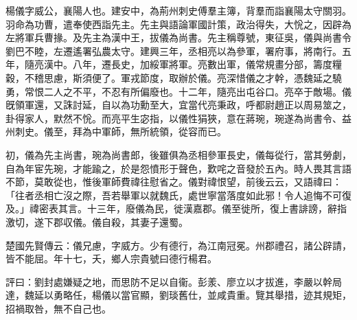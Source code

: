 
\begin{pinyinscope}
楊儀字威公，襄陽人也。建安中，為荊州刺史傅羣主簿，背羣而詣襄陽太守關羽。羽命為功曹，遣奉使西詣先主。先主與語論軍國計策，政治得失，大恱之，因辟為左將軍兵曹掾。及先主為漢中王，拔儀為尚書。先主稱尊號，東征吳，儀與尚書令劉巴不睦，左遷遙署弘農太守。建興三年，丞相亮以為參軍，署府事，將南行。五年，隨亮漢中。八年，遷長史，加綏軍將軍。亮數出軍，儀常規畫分部，籌度糧穀，不稽思慮，斯須便了。軍戎節度，取辦於儀。亮深惜儀之才幹，憑魏延之驍勇，常恨二人之不平，不忍有所偏廢也。十二年，隨亮出屯谷口。亮卒于敵場。儀旣領軍還，又誅討延，自以為功勳至大，宜當代亮秉政，呼都尉趙正以周易筮之，卦得家人，默然不恱。而亮平生宓指，以儀性狷狹，意在蔣琬，琬遂為尚書令、益州刺史。儀至，拜為中軍師，無所統領，從容而已。

初，儀為先主尚書，琬為尚書郎，後雖俱為丞相參軍長史，儀每從行，當其勞劇，自為年宦先琬，才能踰之，於是怨憤形于聲色，歎咤之音發於五內。時人畏其言語不節，莫敢從也，惟後軍師費禕往慰省之。儀對禕恨望，前後云云，又語禕曰：「往者丞相亡沒之際，吾若舉軍以就魏氏，處世寧當落度如此邪！令人追悔不可復及。」禕密表其言。十三年，廢儀為民，徙漢嘉郡。儀至徙所，復上書誹謗，辭指激切，遂下郡収儀。儀自殺，其妻子還蜀。

楚國先賢傳云：儀兄慮，字威方。少有德行，為江南冠冕。州郡禮召，諸公辟請，皆不能屈。年十七，夭，鄉人宗貴號曰德行楊君。

評曰：劉封處嫌疑之地，而思防不足以自衞。彭羕、廖立以才拔進，李嚴以幹局達，魏延以勇略任，楊儀以當官顯，劉琰舊仕，並咸貴重。覽其舉措，迹其規矩，招禍取咎，無不自己也。


\end{pinyinscope}